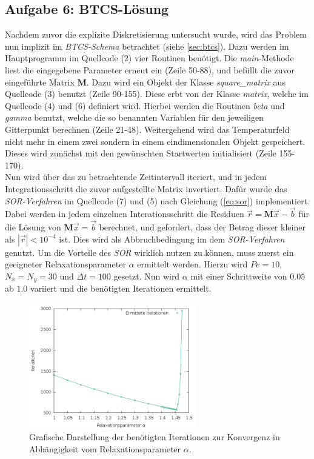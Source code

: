 \documentclass[12pt,a4paper,titlepage,headinclude,bibtotoc]{scrartcl}
\begin{document}
\subsection{Aufgabe 6: BTCS-Lösung}
\label{sec:task6}
Nachdem zuvor die explizite Diskretisierung untersucht wurde, wird das Problem nun implizit im \textit{BTCS-Schema} betrachtet (siehe \ref{sec:btcs}). Dazu werden im Hauptprogramm im Quellcode (2) vier Routinen benötigt.
Die \textit{main}-Methode liest die eingegebene Parameter erneut ein (Zeile 50-88), und befüllt die zuvor eingeführte Matrix $\textbf{M}$. Dazu wird ein Objekt der Klasse \textit{square\_matrix} aus Quellcode (3) benutzt (Zeile 90-155). Diese erbt von der Klasse \textit{matrix}, welche im Quellcode (4) und (6) definiert wird. Hierbei werden die Routinen \textit{beta} und \textit{gamma} benutzt, welche die so benannten Variablen für den jeweiligen Gitterpunkt berechnen (Zeile 21-48). Weitergehend wird das Temperaturfeld nicht mehr in einem zwei sondern in einem eindimensionalen Objekt gespeichert. Dieses wird zunächst mit den gewünschten Startwerten initialisiert (Zeile 155-170).\\
Nun wird über das zu betrachtende Zeitintervall iteriert, und in jedem Integrationsschritt die zuvor aufgestellte Matrix invertiert. Dafür wurde das \textit{SOR-Verfahren} im Quellcode (7) und (5) nach Gleichung (\ref{eq:sor}) implementiert. Dabei werden in jedem einzelnen Interationsschritt die Residuen $\vec{r} = \textbf{M} \vec{x}-\vec{b}$ für die Lösung von $\textbf{M} \vec{x} = \vec{b}$ berechnet, und gefordert, dass der Betrag dieser kleiner als $|\vec{r}| < 10^{-4}$ ist. Dies wird als Abbruchbedingung im dem \textit{SOR-Verfahren} genutzt. Um die Vorteile des \textit{SOR} wirklich nutzen zu können, muss zuerst ein geeigneter Relaxationsparameter $\alpha$ ermittelt werden. Hierzu wird $Pe=10$, $N_x=N_y = 30$ und $\Delta t=100$ gesetzt. Nun wird $\alpha$ mit einer Schrittweite von $0.05$ ab $1.0$ variiert und die benötigten Iterationen ermittelt. 
\begin{figure}[H]
 \centering
   \includegraphics[width=0.65\textwidth]{res/task6/sor_parameter.png}
   \caption{Grafische Darstellung der benötigten Iterationen zur Konvergenz in Abhängigkeit vom Relaxationsparameter $\alpha$.}
 \label{fig:task6_param_comp}
\end{figure}
\end{document}
